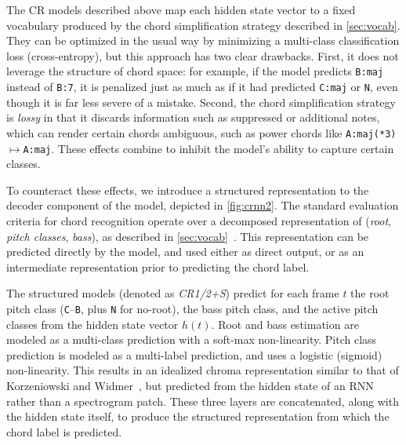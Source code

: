 \documentclass{article}
\begin{document}
The CR models described above map each hidden state vector to a fixed vocabulary produced by the chord simplification strategy described in \cref{sec:vocab}.
They can be optimized in the usual way by minimizing a multi-class classification loss (cross-entropy), but this approach has two clear drawbacks.
First, it does not leverage the structure of chord space: for example, if the model predicts \texttt{B:maj} instead of \texttt{B:7}, it is penalized just as much as if it had predicted \texttt{C:maj} or \texttt{N}, even though it is far less severe of a mistake.
Second, the chord simplification strategy is \emph{lossy} in that it discards information such as suppressed or additional notes, which can render certain chords ambiguous, such as power chords like \texttt{A:maj(*3)}$\mapsto$\texttt{A:maj}.
These effects combine to inhibit the model's ability to capture certain classes.

To counteract these effects, we introduce a structured representation to the decoder component of the model, depicted in \cref{fig:crnn2}.
The standard evaluation criteria for chord recognition operate over a decomposed representation of (\emph{root}, \emph{pitch classes}, \emph{bass}), as described in \cref{sec:vocab}~\cite{raffel2014mir_eval}.
This representation can be predicted directly by the model, and used either as direct output, or as an intermediate representation prior to predicting the chord label.


The structured models (denoted as \emph{CR1/2+S}) predict for each frame $t$ the root pitch class (\texttt{C}--\texttt{B}, plus \texttt{N} for no-root), the bass pitch class, and the active pitch classes from the hidden state vector $h(t)$.
Root and bass estimation are modeled as a multi-class prediction with a soft-max non-linearity.
Pitch class prediction is modeled as a multi-label prediction, and uses a logistic (sigmoid) non-linearity.
This results in an idealized chroma representation similar to that of Korzeniowski and Widmer~\cite{korzeniowski2016feature}, but predicted from the hidden state of an RNN rather than a spectrogram patch.
These three layers are concatenated, along with the hidden state itself, to produce the structured representation from which the chord label is predicted.
\end{document}
